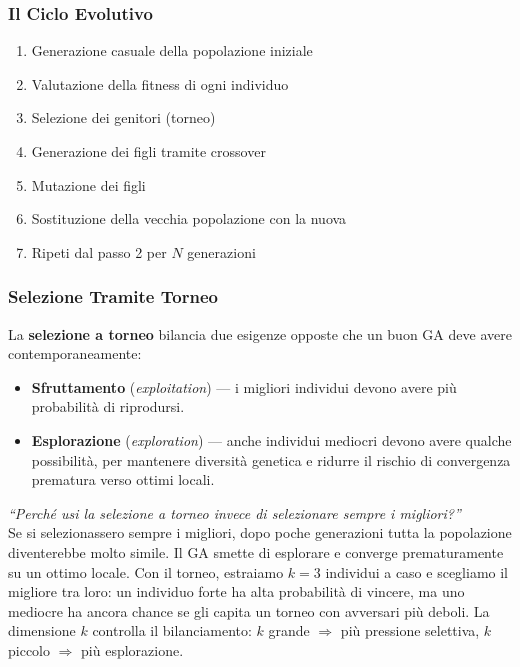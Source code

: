 \documentclass[12pt, a4paper]{article}
\begin{document}
\subsubsection{Il Ciclo Evolutivo}

\begin{enumerate}
    \item Generazione casuale della popolazione iniziale
    \item Valutazione della fitness di ogni individuo
    \item Selezione dei genitori (torneo)
    \item Generazione dei figli tramite crossover
    \item Mutazione dei figli
    \item Sostituzione della vecchia popolazione con la nuova
    \item Ripeti dal passo 2 per $N$ generazioni
\end{enumerate}

\subsubsection{Selezione Tramite Torneo}

La \textbf{selezione a torneo} bilancia due esigenze opposte che un buon GA
deve avere contemporaneamente:

\begin{itemize}
    \item \textbf{Sfruttamento} (\textit{exploitation}) --- i migliori individui
          devono avere più probabilità di riprodursi.
    \item \textbf{Esplorazione} (\textit{exploration}) --- anche individui
          mediocri devono avere qualche possibilità, per mantenere diversità
          genetica e ridurre il rischio di convergenza prematura verso ottimi locali.
\end{itemize}

\begin{domanda}
\textit{``Perché usi la selezione a torneo invece di selezionare sempre i migliori?''}\\
Se si selezionassero sempre i migliori, dopo poche generazioni tutta la
popolazione diventerebbe molto simile. Il GA smette di esplorare e converge
prematuramente su un ottimo locale. Con il torneo, estraiamo $k=3$ individui
a caso e scegliamo il migliore tra loro: un individuo forte ha alta probabilità
di vincere, ma uno mediocre ha ancora chance se gli capita un torneo con
avversari più deboli. La dimensione $k$ controlla il bilanciamento:
$k$ grande $\Rightarrow$ più pressione selettiva, $k$ piccolo $\Rightarrow$ più esplorazione.
\end{domanda}
\end{document}
